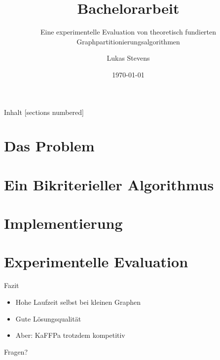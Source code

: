 \documentclass[12pt]{beamer}
\title{Bachelorarbeit}
\subtitle{Eine experimentelle Evaluation von theoretisch fundierten Graphpartitionierungsalgorithmen}
\date{\today}
\author{Lukas Stevens}
\institute{Technische Universität München}
\begin{document}
\maketitle

\begin{frame}{Inhalt}
  [sections numbered]
  \tableofcontents[hideallsubsections]
\end{frame}

\section{Das Problem}


\section{Ein Bikriterieller Algorithmus}


\section{Implementierung}


\section{Experimentelle Evaluation}




\begin{frame}{Fazit}
    \begin{itemize}[<+(1)->]
        \item Hohe Laufzeit selbst bei kleinen Graphen
        \item Gute Lösungsqualität
        \item Aber: KaFFPa trotzdem kompetitiv
    \end{itemize}
\end{frame}

\begin{frame}[standout]
    \LARGE Fragen?
\end{frame}
\end{document}
